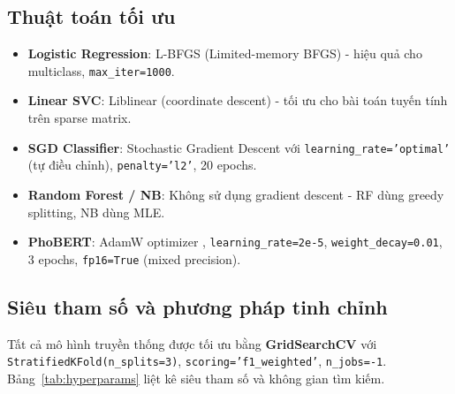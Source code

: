 \subsection{Thuật toán tối ưu}

\begin{itemize}
    \item \textbf{Logistic Regression}: L-BFGS (Limited-memory BFGS) - hiệu quả cho multiclass, \texttt{max\_iter=1000}.
    \item \textbf{Linear SVC}: Liblinear (coordinate descent) - tối ưu cho bài toán tuyến tính trên sparse matrix.
    \item \textbf{SGD Classifier}: Stochastic Gradient Descent với \texttt{learning\_rate='optimal'} (tự điều chỉnh), \texttt{penalty='l2'}, 20 epochs.
    \item \textbf{Random Forest / NB}: Không sử dụng gradient descent - RF dùng greedy splitting, NB dùng MLE.
    \item \textbf{PhoBERT}: AdamW optimizer \parencite{loshchilov2019adamw}, \texttt{learning\_rate=2e-5}, \texttt{weight\_decay=0.01}, 3 epochs, \texttt{fp16=True} (mixed precision).
\end{itemize}

\subsection{Siêu tham số và phương pháp tinh chỉnh}

Tất cả mô hình truyền thống được tối ưu bằng \textbf{GridSearchCV} \parencite{sklearn2011} với \texttt{StratifiedKFold(n\_splits=3)}, \texttt{scoring='f1\_weighted'}, \texttt{n\_jobs=-1}. Bảng~\ref{tab:hyperparams} liệt kê siêu tham số và không gian tìm kiếm.

